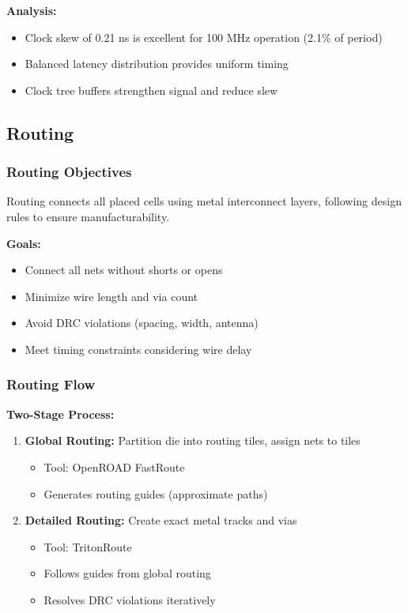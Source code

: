 \documentclass[12pt,a4paper]{article}
\begin{document}
\textbf{Analysis:}
\begin{itemize}
    \item Clock skew of 0.21 ns is excellent for 100 MHz operation (2.1\% of period)
    \item Balanced latency distribution provides uniform timing
    \item Clock tree buffers strengthen signal and reduce slew
\end{itemize}

\newpage

\subsection{Routing}

\subsubsection{Routing Objectives}

Routing connects all placed cells using metal interconnect layers, following design rules to ensure manufacturability.

\textbf{Goals:}
\begin{itemize}
    \item Connect all nets without shorts or opens
    \item Minimize wire length and via count
    \item Avoid DRC violations (spacing, width, antenna)
    \item Meet timing constraints considering wire delay
\end{itemize}

\subsubsection{Routing Flow}

\textbf{Two-Stage Process:}

\begin{enumerate}
    \item \textbf{Global Routing:} Partition die into routing tiles, assign nets to tiles
    \begin{itemize}
        \item Tool: OpenROAD FastRoute
        \item Generates routing guides (approximate paths)
    \end{itemize}
    
    \item \textbf{Detailed Routing:} Create exact metal tracks and vias
    \begin{itemize}
        \item Tool: TritonRoute
        \item Follows guides from global routing
        \item Resolves DRC violations iteratively
    \end{itemize}
\end{enumerate}
\end{document}
